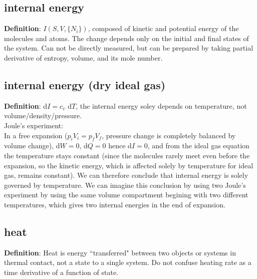 \subsection{internal energy}
{\bf{Definition}}: $I(S,V,\{N_i\})$, composed of kinetic and potential energy of the molecules and
atoms. The change depends only on the initial and final states of the system. Can not be directly
measured, but can be prepared by taking partial derivative of entropy, volume, and its mole number.

\subsection{internal energy (dry ideal gas)}
{\bf{Definition}}: d$I = c_v$ d$T$, the internal energy soley depends on temperature, not
volume/density/pressure. \\

{Joule's experiment:} \\
In a free expansion ($p_iV_i = p_fV_f$, pressure change is completely balanced by volume change),
d$W = 0$, d$Q = 0$ hence d$I = 0$, and from the ideal gas equation the temperature stays constant
(since the molecules rarely meet even before the expansion, so the kinetic energy, which is affected
solely by temperature for ideal gas, remains constant). We can therefore conclude that internal
energy is solely governed by temperature. We can imagine this conclusion by using two Joule's
experiment by using the same volume compartment begining with two different temperatures, which
gives two internal energies in the end of expansion. 


\subsection{heat}
{\bf{Definition}}: Heat is energy ``transferred" between two objects or systems in thermal contact, not
a state to a single system. Do not confuse heating rate as a time derivative of a function of state.


